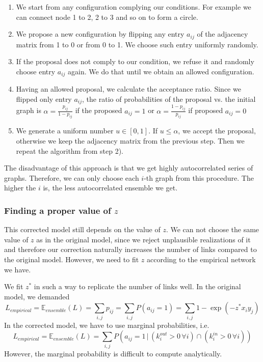 \documentclass{article}
\begin{document}
\begin{enumerate}
\item We start from any configuration complying our conditions. For example we can connect node 1 to 2, 2 to 3 and so on to form a circle. 
\item We propose a new configuration by flipping any entry $a_{ij}$ of the adjacency matrix from 1 to 0 or from 0 to 1. We choose such entry uniformly randomly.
\item If the proposal does not comply to our condition, we refuse it and randomly choose entry $a_{ij}$ again. We do that until we obtain an allowed configuration.
\item Having an allowed proposal, we calculate the acceptance ratio. Since we flipped only entry $a_{ij}$, the ratio of probabilities of the proposal vs. the initial graph is $\alpha = \frac{p_{ij}}{1-p_{ij}}$ if the proposed $a_{ij} = 1$ or $\alpha = \frac{1-p_{ij}}{p_{ij}}$ if proposed $a_{ij} = 0$
\item We generate a uniform number $u \in [0,1]$. If $u\leq\alpha$, we accept the proposal, otherwise we keep the adjacency matrix from the previous step. Then we repeat the algorithm from step 2).
\end{enumerate}

The disadvantage of this approach is that we get highly autocorrelated series of graphs. Therefore, we can only choose each $i$-th graph from this procedure. The higher the $i$ is, the less autocorrelated ensemble we get.

\subsubsection{Finding a proper value of $z$}
This corrected model still depends on the value of $z$. We can not choose the same value of $z$ as in the original model, since we reject unplausible realizations of it and therefore our correction naturally increases the number of links compared to the original model. However, we need to fit $z$ according to the empirical network we have.

We fit $z^*$ in such a way to replicate the number of links well. In the original model, we demanded
\begin{equation}
    L_{empirical} = \mathbb{E}_{ensemble}(L) = \sum_{i,j} p_{ij} = \sum_{i,j} P(a_{ij} = 1) = \sum_{i,j} 1-\exp{(-z^*x_iy_j)}
\end{equation}
In the corrected model, we have to use marginal probabilities, i.e.
\begin{equation}
    L_{empirical} = \mathbb{E}_{ensemble}(L) = \sum_{i,j} P(a_{ij} = 1\, | \, (k_i^{out} > 0 \, \forall i) \cap (k_i^{in} > 0 \, \forall i ))
\end{equation}
However, the marginal probability is difficult to compute analytically. 
\end{document}
